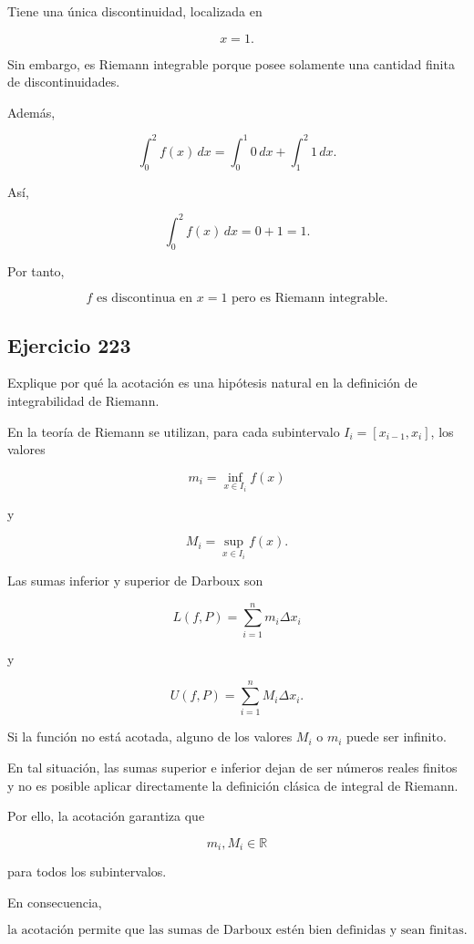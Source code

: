 \documentclass[12pt]{article}
\begin{document}
Tiene una única discontinuidad, localizada en

\[
x=1.
\]

Sin embargo, es Riemann integrable porque posee solamente una cantidad
finita de discontinuidades.

Además,

\[
\int_0^2f(x)\,dx
=
\int_0^1 0\,dx
+
\int_1^2 1\,dx.
\]

Así,

\[
\int_0^2f(x)\,dx
=
0+1
=
1.
\]

Por tanto,

\[
\boxed{
f \text{ es discontinua en }x=1
\text{ pero es Riemann integrable}
}.
\]

\subsection*{Ejercicio 223}

Explique por qué la acotación es una hipótesis natural en la definición
de integrabilidad de Riemann.

En la teoría de Riemann se utilizan, para cada subintervalo
\(I_i=[x_{i-1},x_i]\), los valores

\[
m_i=\inf_{x\in I_i}f(x)
\]

y

\[
M_i=\sup_{x\in I_i}f(x).
\]

Las sumas inferior y superior de Darboux son

\[
L(f,P)
=
\sum_{i=1}^n m_i\Delta x_i
\]

y

\[
U(f,P)
=
\sum_{i=1}^n M_i\Delta x_i.
\]

Si la función no está acotada, alguno de los valores \(M_i\) o \(m_i\)
puede ser infinito.

En tal situación, las sumas superior e inferior dejan de ser números
reales finitos y no es posible aplicar directamente la definición
clásica de integral de Riemann.

Por ello, la acotación garantiza que

\[
m_i,M_i\in\mathbb{R}
\]

para todos los subintervalos.

En consecuencia,

\[
\boxed{
\text{la acotación permite que las sumas de Darboux estén bien
definidas y sean finitas}
}.
\]

\end{document}
